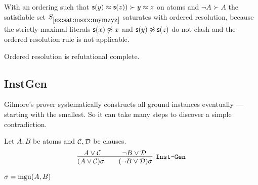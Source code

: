 \begin{example}
	With an ordering such that \( \mathsf{s}(y)\approx\mathsf{s}(z)) \succ y\approx z \) on atoms and \( {\lnot A} \succ A \)
	the satisfiable set \( S_{\ref{ex:sat:msxx:mymzyz}} \) saturates with ordered resolution,
	because the strictly maximal literals
	\( \mathsf{s}(x)\not\approx x \) and
	\( \mathsf{s}(y)\not\approx\mathsf{s}(z) \)
	do not clash and the ordered resolution rule is not applicable.
\end{example}



\begin{lemma}
	Ordered resolution is refutational complete.
\end{lemma}




\subsection{InstGen}\label{sec:inst:gen}

Gilmore's prover systematically constructs all ground instances eventually --- starting with the smallest. So it can take many steps to discover a simple contradiction.

\begin{definition}[\InstGen] Let \( A, B \) be atoms and \( \mathcal{C},\mathcal{D} \) be clauses.
	\begin{gather*}
	\infer
	[{\InstGen}]
	{(A\lor\mathcal C)\sigma\qquad (\lnot B\lor\mathcal D)\sigma}
	{A\lor\mathcal C\quad&\quad \lnot B\lor\mathcal D}
	\end{gather*}
	\begin{center}\( \sigma=\operatorname{mgu}(A,B) \)
	\end{center}
\end{definition}


